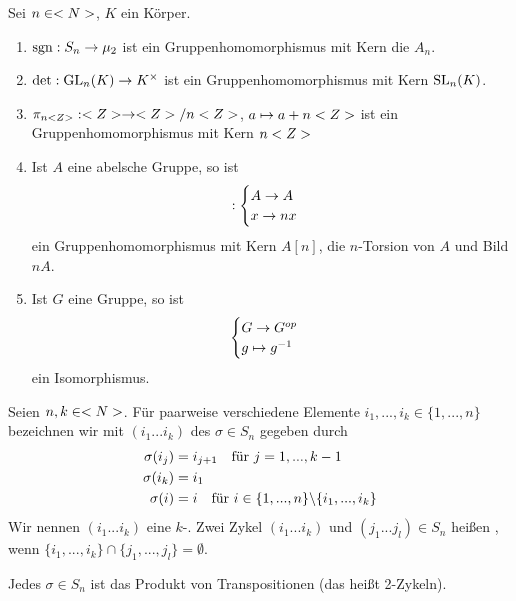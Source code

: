 \begin{example}
	Sei $n\in<N>$, $K$ ein Körper.
	\begin{enumerate}[label=(\alph*)]
		\item $\operatorname{sgn}:S_n\to\mu_2$ ist ein Gruppenhomomorphismus mit Kern die  $A_n$.
		\item $\det:\operatorname{GL}_n(K)\to K^\times$ ist ein Gruppenhomomorphismus mit Kern $\operatorname{SL}_n(K)$.
		\item $\pi_{n<Z>}:<Z>\to<Z>/n<Z>$, $a\mapsto a+n<Z>$ ist ein Gruppenhomomorphismus mit Kern $n<Z>$
		\item Ist $A$ eine abelsche Gruppe, so ist
		\begin{align}
			[n]:\begin{cases}
				A\to A \\ x\to nx
			\end{cases}\notag
		\end{align}
		ein Gruppenhomomorphismus mit Kern $A[n]$, die $n$-Torsion von $A$ und Bild $nA$.
		\item Ist $G$ eine Gruppe, so ist
		\begin{align}
			\begin{cases}
				G\to G^{op} \\ g\mapsto g^{-1}
			\end{cases}\notag
		\end{align}
		ein Isomorphismus.
	\end{enumerate}
\end{example}

\begin{definition}
	Seien $n,k\in<N>$. Für paarweise verschiedene Elemente $i_1,...,i_k\in\{1,...,n\}$ bezeichnen wir mit $(i_1...i_k)$ des $\sigma\in S_n$ gegeben durch
	\begin{align}
		\sigma(i_j) &= i_{j+1} \quad \text{für } j=1,...,k-1 \notag \\
		\sigma(i_k) &= i_1 \notag \\
		\sigma(i) &= i \quad \text{für } i\in\{1,...,n\}\backslash\{i_1,...,i_k\}\notag
	\end{align}
	Wir nennen $(i_1...i_k)$ eine $k$-. Zwei Zykel $(i_1...i_k)$ und $(j_1...j_l)\in S_n$ heißen , wenn $\{i_1,...,i_k\}\cap\{j_1,...,j_l\}=\emptyset$.
\end{definition}

\begin{proposition}
	Jedes $\sigma\in S_n$ ist das Produkt von Transpositionen (das heißt 2-Zykeln).
\end{proposition}

